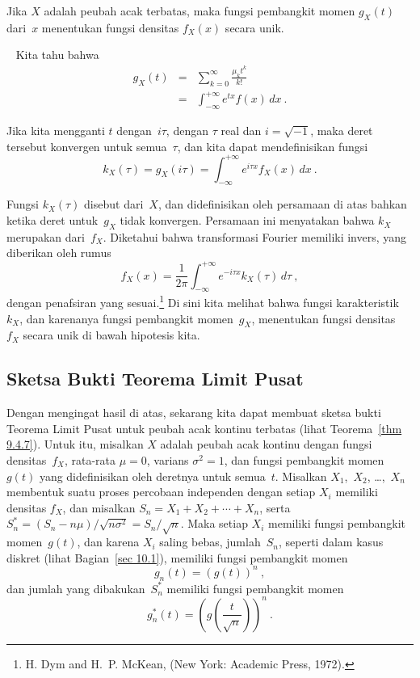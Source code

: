 \begin{theorem}\label{thm 10.5}
Jika $X$ adalah peubah acak terbatas, maka fungsi pembangkit momen
$g_X(t)$ dari~$x$ menentukan fungsi densitas $f_X(x)$ secara unik.
\vspace{.385in} 

\noindent {}~                                             
Kita tahu bahwa
\begin{eqnarray*}
g_X(t) &=& \sum_{k = 0}^\infty \frac{\mu_k t^k}{k!} \\
       &=& \int_{-\infty}^{+\infty} e^{tx} f(x)\, dx\ .
\end{eqnarray*}


\noindent Jika kita mengganti $t$ dengan~$i\tau$, dengan $\tau$ real dan $i = \sqrt{-1}$, maka
deret tersebut konvergen untuk semua~$\tau$, dan kita dapat mendefinisikan fungsi
$$
k_X(\tau) = g_X(i\tau) = \int_{-\infty}^{+\infty} e^{i\tau x} f_X(x)\, dx\ .
$$

Fungsi $k_X(\tau)$ disebut  dari~$X$, dan didefinisikan oleh persamaan di atas bahkan ketika deret untuk~$g_X$ tidak
konvergen.  Persamaan ini menyatakan bahwa $k_X$ merupakan  dari~$f_X$.  Diketahui bahwa transformasi Fourier memiliki invers, yang diberikan oleh
rumus
$$
f_X(x) = \frac1{2\pi} \int_{-\infty}^{+\infty} e^{-i\tau x} k_X(\tau)\, d\tau\ ,
$$
dengan penafsiran yang sesuai.\footnote{H. Dym and H.~P. McKean,  (New York: Academic Press, 1972).}  Di sini kita melihat bahwa
fungsi karakteristik~$k_X$, dan karenanya fungsi pembangkit momen~$g_X$,
menentukan fungsi densitas~$f_X$ secara unik di bawah hipotesis kita.
\end{theorem} 

\subsection*{Sketsa Bukti Teorema Limit Pusat}
Dengan mengingat hasil di atas, sekarang kita dapat membuat sketsa bukti Teorema Limit Pusat
untuk peubah acak kontinu terbatas (lihat Teorema~\ref{thm 9.4.7}).  Untuk itu,
misalkan $X$ adalah peubah acak kontinu dengan fungsi densitas~$f_X$, rata-rata $\mu
= 0$, varians $\sigma^2 = 1$, dan fungsi pembangkit momen~$g(t)$ yang didefinisikan
oleh deretnya untuk semua~$t$.  Misalkan $X_1$,~$X_2$, \ldots,~$X_n$ membentuk suatu proses
percobaan independen dengan setiap $X_i$ memiliki densitas $f_X$, dan misalkan $S_n = X_1 + X_2
+\cdots+ X_n$, serta $S_n^* = (S_n - n\mu)/\sqrt{n\sigma^2} = S_n/\sqrt n$.  Maka
setiap $X_i$ memiliki fungsi pembangkit momen~$g(t)$, dan karena $X_i$ saling
bebas, jumlah~$S_n$, seperti dalam kasus diskret (lihat Bagian~\ref{sec 10.1}),
memiliki fungsi pembangkit momen
$$
g_n(t) = (g(t))^n\ ,
$$
dan jumlah yang dibakukan~$S_n^*$ memiliki fungsi pembangkit momen
$$
g_n^*(t) = \left(g\left(\frac t{\sqrt n}\right)\right)^n\ .
$$

